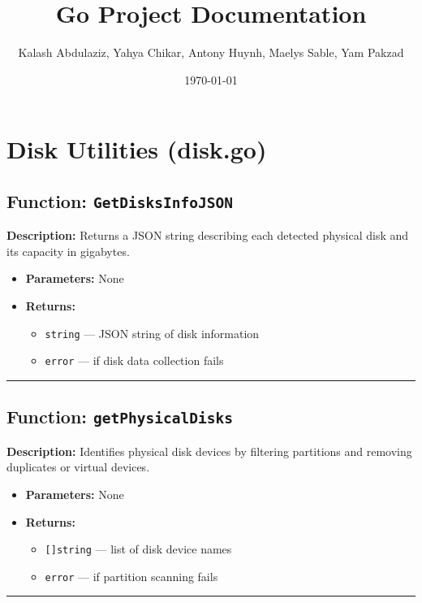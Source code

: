 \documentclass[12pt,a4paper]{article}
\title{Go Project Documentation}
\author{Kalash Abdulaziz, Yahya Chikar, Antony Huynh, Maelys Sable, Yam Pakzad}
\date{\today}
\begin{document}
\maketitle
\tableofcontents
\newpage

\section{Disk Utilities (disk.go)}

\subsection*{Function: \texttt{GetDisksInfoJSON}}
\textbf{Description:} Returns a JSON string describing each detected physical disk and its capacity in gigabytes.
\begin{itemize}[leftmargin=2cm,label={--}]
  \item \textbf{Parameters:} None
  \item \textbf{Returns:}
  \begin{itemize}
    \item \texttt{string} — JSON string of disk information
    \item \texttt{error} — if disk data collection fails
  \end{itemize}
\end{itemize}
\hrule\vspace{1em}

\subsection*{Function: \texttt{getPhysicalDisks}}
\textbf{Description:} Identifies physical disk devices by filtering partitions and removing duplicates or virtual devices.
\begin{itemize}[leftmargin=2cm,label={--}]
  \item \textbf{Parameters:} None
  \item \textbf{Returns:}
  \begin{itemize}
    \item \texttt{[]string} — list of disk device names
    \item \texttt{error} — if partition scanning fails
  \end{itemize}
\end{itemize}
\hrule\vspace{1em}
\end{document}

